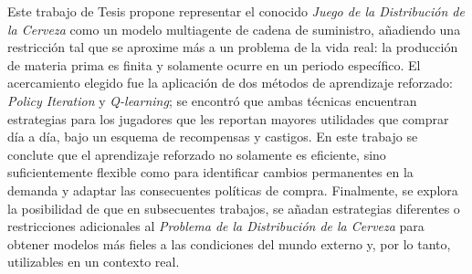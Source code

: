 
Este trabajo de Tesis propone representar el conocido \textit{Juego de la Distribuci\'on de la Cerveza} como un modelo multiagente de cadena de suministro, a\~nadiendo una restricci\'on tal que se aproxime m\'as a un problema de la vida real: la producci\'on de materia prima es finita y solamente ocurre en un periodo espec\'ifico. El acercamiento elegido fue la aplicaci\'on de dos m\'etodos de aprendizaje reforzado: \textit{Policy Iteration} y \textit{Q-learning}; se encontr\'o que ambas t\'ecnicas encuentran estrategias para los jugadores que les reportan mayores utilidades que comprar d\'ia a d\'ia, bajo un esquema de recompensas y castigos. En este trabajo se conclute que el aprendizaje reforzado no solamente es eficiente, sino suficientemente flexible como para identificar cambios permanentes en la demanda y adaptar las consecuentes pol\'iticas de compra. Finalmente, se explora la posibilidad de que en subsecuentes trabajos, se a\~nadan estrategias diferentes o restricciones adicionales al \textit{Problema de la Distribuci\'on de la Cerveza} para obtener modelos m\'as fieles a las condiciones del mundo externo y, por lo tanto, utilizables en un contexto real.
